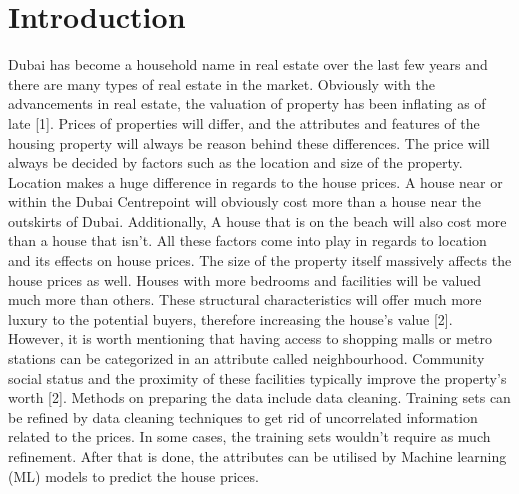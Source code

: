 \documentclass[conference]{IEEEtran}
\begin{document}
\section{Introduction}
Dubai has become a household name in real estate over the last few years and there are many types of real estate in the market. Obviously with the advancements in real estate, the valuation of property has been inflating as of late [1]. Prices of properties will differ, and the attributes and features of the housing property will always be reason behind these differences. The price will always be decided by factors such as the location and size of the property.
Location makes a huge difference in regards to the house prices. A house near or within the Dubai Centrepoint will obviously cost more than a house near the outskirts of Dubai. Additionally, A house that is on the beach will also cost more than a house that isn’t. All these factors come into play in regards to location and its effects on house prices.
The size of the property itself massively affects the house prices as well. Houses with more bedrooms and facilities will be valued much more than others. These structural characteristics will offer much more luxury to the potential buyers, therefore increasing the house’s value [2].
However, it is worth mentioning that having access to shopping malls or metro stations can be categorized in an attribute called neighbourhood. Community social status and the proximity of these facilities typically improve the property’s worth [2].
Methods on preparing the data include data cleaning. Training sets can be refined by data cleaning techniques to get rid of uncorrelated information related to the prices. In some cases, the training sets wouldn’t require as much refinement. After that is done, the attributes can be utilised by Machine learning (ML) models to predict the house prices.
\end{document}
